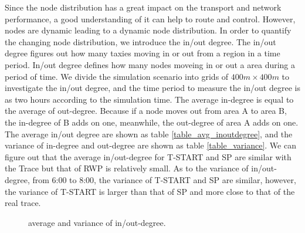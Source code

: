 Since the node distribution has a great impact on the transport and network performance, a good understanding of it can help to route and control.  However, nodes are dynamic leading to a dynamic node distribution. In order to quantify the changing node distribution,  we introduce the in/out degree. The in/out degree figures out how many taxies moving in or out from a region in a time period. In/out degree defines how many nodes moveing in or out a area during a period of time. 
We divide the simulation scenario into grids of $ 400m \times 400 m$ to investigate the in/out degree, and the time period to measure the in/out degree is as two hours according to the simulation time. 
The average in-degree is equal to the average of out-degree. Because if a node moves out from area A to area B, the in-degree of B adds on one, meanwhile, the out-degree of area A adds on one. The average in/out degree are shown as table \ref{table_avg_inoutdegree}, and the variance of in-degree and out-degree are shown as table \ref{table_variance}.
We can figure out that the average in/out-degree for T-START and SP are similar with the Trace but that of RWP is relatively small. As to the variance of in/out-degree, from 6:00 to 8:00, the variance of T-START and SP are similar, however, the variance of T-START is larger than that of SP and more close to that of the real trace.  
\begin{figure}[!t]
\centering
{}
\caption{average and variance of in/out-degree.}\label{figure_avg}
\end{figure}

